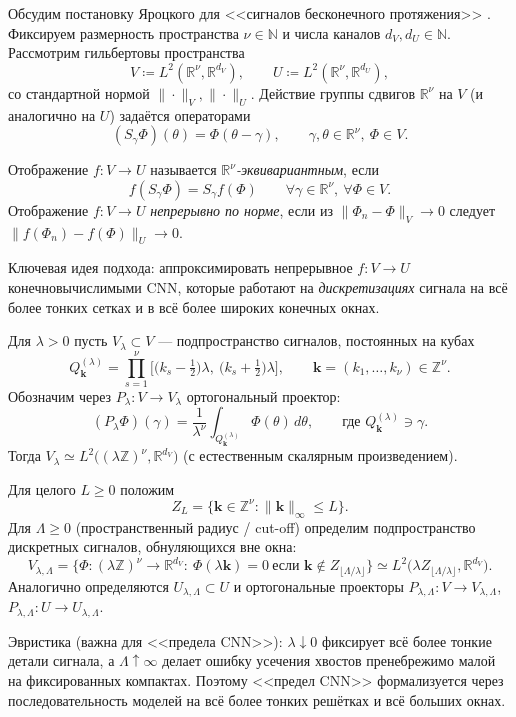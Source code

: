 \documentclass[../NDCNNAI_main.tex]{subfiles}
\begin{document}
Обсудим постановку Яроцкого для <<сигналов бесконечного протяжения>> \cite{Yarotsky2018}.
Фиксируем размерность пространства $\nu\in\mathbb{N}$ и числа каналов $d_V,d_U\in\mathbb{N}$.
Рассмотрим гильбертовы пространства
\[
V\coloneq L^2(\mathbb{R}^\nu,\mathbb{R}^{d_V}),\qquad
U\coloneq L^2(\mathbb{R}^\nu,\mathbb{R}^{d_U}),
\]
со стандартной нормой $\|\cdot\|_V,\|\cdot\|_U$.
Действие группы сдвигов $\mathbb{R}^\nu$ на $V$ (и аналогично на $U$) задаётся операторами
\[
(S_\gamma \Phi)(\theta)=\Phi(\theta-\gamma),\qquad \gamma,\theta\in\mathbb{R}^\nu,\ \Phi\in V.
\]

Отображение $f\colon V\to U$ называется \emph{$\mathbb{R}^\nu$-эквивариантным}, если
\[
f(S_\gamma\Phi)=S_\gamma f(\Phi)\qquad \forall \gamma\in\mathbb{R}^\nu,\ \forall \Phi\in V.
\]  
Отображение $f\colon V\to U$ \emph{непрерывно по норме}, если из $\|\Phi_n-\Phi\|_V\to 0$
следует $\|f(\Phi_n)-f(\Phi)\|_U\to 0$.

Ключевая идея подхода: аппроксимировать непрерывное $f\colon V\to U$ конечновычислимыми CNN, которые работают
на \emph{дискретизациях} сигнала на всё более тонких сетках и в всё более широких конечных окнах.

Для $\lambda>0$ пусть $V_\lambda\subset V$ --- подпространство сигналов, постоянных на кубах
\[
Q^{(\lambda)}_{\mathbf{k}}=\prod_{s=1}^\nu\Big[\big(k_s-\tfrac12\big)\lambda,\ \big(k_s+\tfrac12\big)\lambda\Big],
\qquad \mathbf{k}=(k_1,\dots,k_\nu)\in\mathbb{Z}^\nu.
\]
Обозначим через $P_\lambda:V\to V_\lambda$ ортогональный проектор:
\[
(P_\lambda\Phi)(\gamma)=\frac{1}{\lambda^\nu}\int_{Q^{(\lambda)}_{\mathbf{k}}}\Phi(\theta)\,d\theta,
\qquad \text{где } Q^{(\lambda)}_{\mathbf{k}}\ni \gamma.
\]
Тогда $V_\lambda\simeq L^2\big((\lambda\mathbb{Z})^\nu,\mathbb{R}^{d_V}\big)$ (с естественным скалярным произведением).

Для целого $L\ge 0$ положим
\[
Z_L=\{\mathbf{k}\in\mathbb{Z}^\nu:\|\mathbf{k}\|_\infty\le L\}.
\]
Для $\Lambda\ge 0$ (пространственный радиус / cut-off) определим подпространство дискретных сигналов,
обнуляющихся вне окна:
\[
V_{\lambda,\Lambda}
=\Big\{\Phi:(\lambda\mathbb{Z})^\nu\to\mathbb{R}^{d_V}:\ \Phi(\lambda\mathbf{k})=0\ \text{если }\mathbf{k}\notin Z_{\lfloor \Lambda/\lambda\rfloor}\Big\}
\simeq L^2\big(\lambda Z_{\lfloor \Lambda/\lambda\rfloor},\mathbb{R}^{d_V}\big).
\]
Аналогично определяются $U_{\lambda,\Lambda}\subset U$ и ортогональные проекторы $P_{\lambda,\Lambda}\colon V\to V_{\lambda,\Lambda}$,
$P_{\lambda,\Lambda}\colon U\to U_{\lambda,\Lambda}$.

Эвристика (важна для <<предела CNN>>): $\lambda\downarrow 0$ фиксирует всё более тонкие детали сигнала,
а $\Lambda\uparrow\infty$ делает ошибку усечения хвостов пренебрежимо малой на фиксированных компактах. Поэтому <<предел CNN>> формализуется через последовательность моделей на всё более тонких решётках и всё больших окнах.
\end{document}
